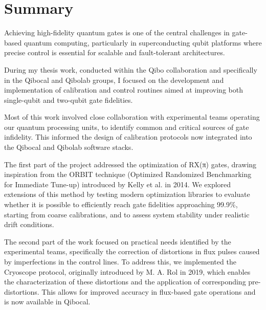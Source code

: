 \chapter*{Summary}

Achieving high-fidelity quantum gates is one of the central challenges in gate-based quantum computing, particularly in superconducting qubit platforms where precise control is essential for scalable and fault-tolerant architectures. 

During my thesis work, conducted within the Qibo collaboration and specifically in the Qibocal and Qibolab groups, I focused on the development and implementation of calibration and control routines aimed at improving both single-qubit and two-qubit gate fidelities.

Most of this work involved close collaboration with experimental teams operating our quantum processing units, to identify common and critical sources of gate infidelity. 
This informed the design of calibration protocols now integrated into the Qibocal and Qibolab software stacks.

The first part of the project addressed the optimization of RX(π) gates, drawing inspiration from the ORBIT technique (Optimized Randomized Benchmarking for Immediate Tune-up) introduced by Kelly et al. in 2014. 
We explored extensions of this method by testing modern optimization libraries to evaluate whether it is possible to efficiently reach gate fidelities approaching 99.9\%, starting from coarse calibrations, and to assess system stability under realistic drift conditions.

The second part of the work focused on practical needs identified by the experimental teams, specifically the correction of distortions in flux pulses caused by imperfections in the control lines. 
To address this, we implemented the Cryoscope protocol, originally introduced by M. A. Rol in 2019, which enables the characterization of these distortions and the application of corresponding pre-distortions. This allows for improved accuracy in flux-based gate operations and is now available in Qibocal.